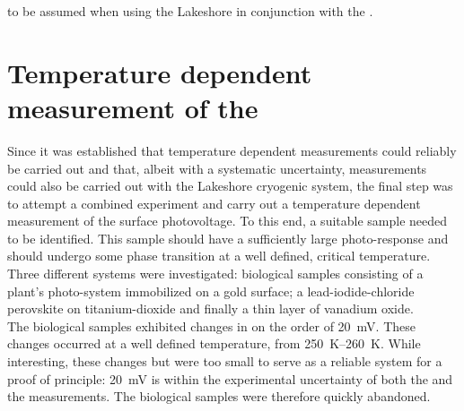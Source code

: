 to be assumed when using the Lakeshore in conjunction with the \led{}.


\section{Temperature dependent measurement of the \spv{}}
Since it was established that temperature dependent \cpd{} measurements could reliably be carried out and that, albeit with a systematic uncertainty, \spv{} measurements could also be carried out with the Lakeshore cryogenic system, the final step was to attempt a combined experiment and carry out a temperature dependent measurement of the surface photovoltage. To this end, a suitable sample needed to be identified. This sample should have a sufficiently large photo-response and should undergo some phase transition at a well defined, critical temperature. Three different systems were investigated: biological samples consisting of a plant's photo-system immobilized on a gold surface; a lead-iodide-chloride perovskite on titanium-dioxide and finally a thin layer of vanadium oxide.\\
The biological samples exhibited changes in \cpd{} on the order of \SI{20}{\milli\volt}. These changes occurred at a well defined temperature, from \SIrange{250}{260}{\kelvin}. While interesting, these changes but were too small to serve as a reliable system for a proof of principle: \SI{20}{\milli\volt} is within the experimental uncertainty of both the \cpd{} and the \spv{} measurements. The biological samples were therefore quickly abandoned.\\
